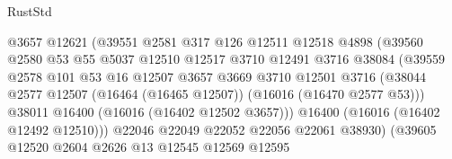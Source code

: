 \begin{lexlean}{RustStd}
\begin{coremodule}
                                    @3657
                                    @12621
                                    (@39551
                                      @2581
                                      @317
                                      @126
                                      @12511
                                      @12518
                                      @4898
                                      (@39560
                                        @2580
                                        @53
                                        @55
                                        @5037
                                        @12510
                                        @12517
                                        @3710
                                        @12491
                                        @3716
                                        @38084
                                        (@39559
                                          @2578
                                          @101
                                          @53
                                          @16
                                          @12507
                                          @3657
                                          @3669
                                          @3710
                                          @12501
                                          @3716
                                          (@38044
                                            @2577
                                            @12507
                                            (@16464 (@16465 @12507))
                                            (@16016 (@16470 @2577 @53)))
                                          @38011
                                          @16400
                                          (@16016 (@16402 @12502 @3657)))
                                        @16400
                                        (@16016 (@16402 @12492 @12510)))
                                      @22046
                                      @22049
                                      @22052
                                      @22056
                                      @22061
                                      @38930)
                                    (@39605
                                      @12520
                                      @2604
                                      @2626
                                      @13
                                      @12545
                                      @12569
                                      @12595

\end{coremodule}
\end{lexlean}
